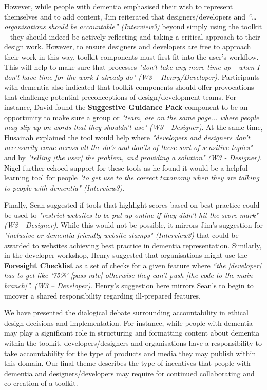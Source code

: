 However, while people with dementia emphasised their wish to represent themselves and to add content, Jim reiterated that designers/developers and \textit{“… organisations should be accountable” (Interview3)} beyond simply using the toolkit – they should indeed be actively reflecting and taking a critical approach to their design work. However, to ensure designers and developers are free to approach their work in this way, toolkit components must first fit into the user's workflow. This will help to make sure that processes \textit{"don't take any more time up - when I don't have time for the work I already do" (W3 – Henry/Developer)}. Participants with dementia also indicated that toolkit components should offer provocations that challenge potential preconceptions of design/development teams. For instance, David found the \textbf{Suggestive Guidance Pack }component to be an opportunity to make sure a group or \textit{"team, are on the same page... where people may slip up on words that they shouldn't use" (W3 - Designer)}. At the same time, Husainah explained the tool would help where \textit{"developers and designers don't necessarily come across all the do's and don'ts of these sort of sensitive topics"} and by \textit{"telling [the user] the problem, and providing a solution" (W3 - Designer)}. Nigel further echoed support for these tools as he found it would be a helpful learning tool for people \textit{"to get use to the correct taxonomy when they are talking to people with dementia" (Interview3)}. 

Finally, Sean suggested if tools that highlight scores based on best practice could be used to \textit{"restrict websites to be put up online if they didn't hit the score mark" (W3 - Designer)}. While this would not be possible, it mirrors Jim's suggestion for \textit{"inclusive or dementia-friendly website stamps" (Interview3)} that could be awarded to websites achieving best practice in dementia representation. Similarly, in the developer workshop, Henry suggested that organisations might use the \textbf{Foresight Checklist} as a set of checks for a given feature where\textit{ “the [developer] has to get like ‘75\%’ [pass rate] otherwise they can’t push [the code to the main branch]”. (W3 – Developer)}. Henry’s suggestion here mirrors Sean’s to begin to uncover a shared responsibility regarding ill-prepared features.

We have presented the dialogical debate surrounding accountability in ethical design decisions and implementation. For instance, while people with dementia may play a significant role in structuring and formatting content about dementia within the toolkit, developers/designers and organisations have a responsibility to take accountability for the type of products and media they may publish within this domain. Our final theme describes the type of incentives that people with dementia and designers/developers may require for continued collaborating and co-creation of a toolkit.


